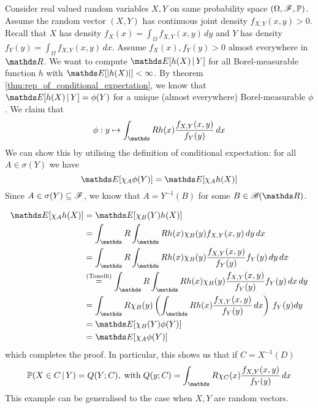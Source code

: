 \begin{example} \label{eg:conditional_expectation_joint_rv}
Consider real valued random variables $X,Y$ on same probability space $(\Omega,\mathcal{F},\mathbb{P})$. Assume the random vector $(X,Y)$ has continuous joint density $f_{X,Y}(x,y) > 0$. Recall that $X$ has density $f_X(x) = \int_\Omega f_{X,Y}(x,y) \, dy$ and $Y$ has density $f_Y(y) = \int_\Omega f_{X,Y}(x,y) \, dx$. Assume $f_X(x), f_Y(y) > 0$ almost everywhere in $\R$. We want to compute $\E[h(X)\,|\,Y]$ for all Borel-measurable function $h$ with $\E[|h(X)|] < \infty$. By theorem \ref{thm:rep_of_conditional_expectation}, we know that $\E[h(X)\,|\,Y] = \phi(Y)$ for a unique (almost everywhere) Borel-measurable $\phi$. We claim that
\begin{equation} \label{eq:conditional_expectation_rv}
    \phi: y \mapsto \int_\R h(x) \frac{f_{X,Y}(x,y)}{f_Y(y)} \, dx
\end{equation}
We can show this by utilising the definition of conditional expectation: for all $A \in \sigma(Y)$ we have
\begin{equation}
    \E[\chi_A \phi(Y)] = \E[\chi_A h(X)]
\end{equation}
Since $A \in \sigma(Y) \subseteq \mathcal{F}$, we know that $A = Y^{-1}(B)$ for some $B \in \B(\R)$.

\begin{align*}
    \E[\chi_A h(X)] &= \E[\chi_B(Y) h(X)] \\
    &= \int_\R \int_\R h(x) \chi_B(y) f_{X,Y}(x,y) \, dy \, dx \\
    &= \int_\R \int_\R h(x) \chi_B(y) \frac{f_{X,Y}(x,y)}{f_Y(y)} f_Y(y) \, dy \, dx \\
    &\overset{\text{(Tonelli)}}{=} \int_\R \int_\R h(x) \chi_B(y) \frac{f_{X,Y}(x,y)}{f_Y(y)} f_Y(y) \, dx \, dy \\
    &= \int_\R \chi_B(y) \bracket{\int_\R h(x) \frac{f_{X,Y}(x,y)}{f_Y(y)} \, dx} \, f_Y(y) dy \\
    &= \E[\chi_B(Y) \phi(Y)] \\
    &= \E[\chi_A \phi(Y)]
\end{align*}
which completes the proof. In particular, this shows us that if $C = X^{-1}(D)$
\begin{equation} \label{eq:regular_conditional_distribution_joint_rv}
    \p(X \in C \,|\, Y) = Q(Y;C), \; \text{with} \; Q(y;C) = \int_\R \chi_C(x) \frac{f_{X,Y}(x,y)}{f_Y(y)} \, dx
\end{equation}
This example can be generalised to the case when $X,Y$ are random vectors.
\end{example}

